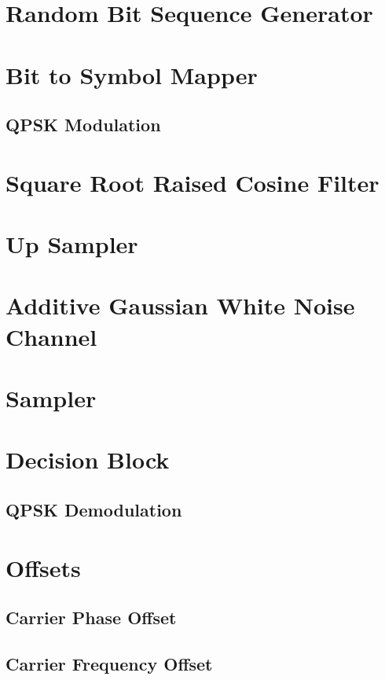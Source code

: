 \documentclass[]{article}
\begin{document}
\section{Random Bit Sequence Generator}
\label{app:random_bit_generator}


\section{Bit to Symbol Mapper}
\label{app:bittosym}

\subsection{QPSK Modulation}
\label{app:qpsk_mod}


\section{Square Root Raised Cosine Filter}
\label{app:sqrt_raised_cosine}


\section{Up Sampler}
\label{app:impulse_train}


\section{Additive Gaussian White Noise Channel}
\label{app:awgn_channel}


\section{Sampler}
\label{app:sampler}


\section{Decision Block}
\label{app:dblocks}
\subsection{QPSK Demodulation}
\label{app:qpsk_demod}


\section{Offsets}
\label{app:offsets}
\subsection{Carrier Phase Offset}
\label{app:phase_offset}


\subsection{Carrier Frequency Offset}
\label{app:freq_offset}

\end{document}
